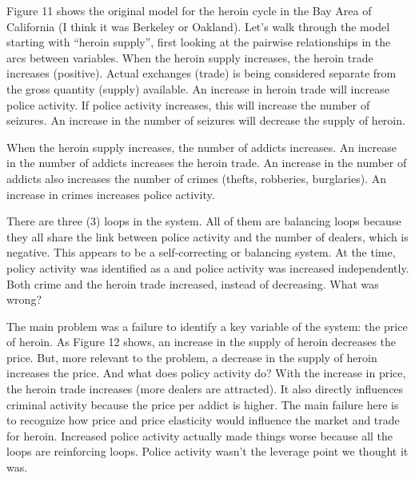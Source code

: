 \documentclass[letterpaper,10pt,english]{sphinxmanual}
\begin{document}
Figure 11 shows the original model for the heroin cycle in the Bay Area of California (I think it was Berkeley or Oakland). Let’s walk through the model starting with “heroin supply”, first looking at the pairwise relationships in the arcs between variables. When the heroin supply increases, the heroin trade increases (positive). Actual exchanges (trade) is being considered separate from the gross quantity (supply) available. An increase in heroin trade will increase police activity. If police
activity increases, this will increase the number of seizures. An increase in the number of seizures will decrease the supply of heroin.

When the heroin supply increases, the number of addicts increases. An increase in the number of addicts increases the heroin trade. An increase in the number of addicts also increases the number of crimes (thefts, robberies, burglaries). An increase in crimes increases police activity.

There are three (3) loops in the system. All of them are balancing loops because they all share the link between police activity and the number of dealers, which is negative. This appears to be a self-correcting or balancing system. At the time, policy activity was identified as a  and police activity was increased independently. Both crime and the heroin trade increased, instead of decreasing. What was wrong?


\begin{DUlineblock}{0em}
\item[] 
\end{DUlineblock}

The main problem was a failure to identify a key variable of the system: the price of heroin. As Figure 12 shows, an increase in the supply of heroin decreases the price. But, more relevant to the problem, a decrease in the supply of heroin increases the price. And what does policy activity do? With the increase in price, the heroin trade increases (more dealers are attracted). It also directly influences criminal activity because the price per addict is higher. The main failure here is to
recognize how price and price elasticity would influence the market and trade for heroin. Increased police activity actually made things worse because all the loops are reinforcing loops. Police activity wasn’t the leverage point we thought it was.
\end{document}
